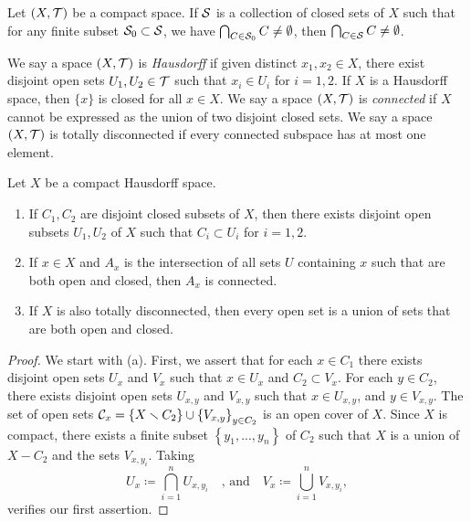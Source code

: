 \begin{lemma}
Let $(X,\mathcal{T})$ be a compact space. If $\mathcal{S}$ is a collection of closed
sets of $X$ such that for any finite subset $\mathcal{S}_0\subset\mathcal{S}$, we have
$\bigcap_{C\in\mathcal{S}_0}C\neq\emptyset$, then $\bigcap_{C\in\mathcal{S}}C\neq\emptyset$.
\end{lemma}

We say a space $(X,\mathcal{T})$ is \emph{Hausdorff} if given distinct
$x_1,x_2\in X$, there exist disjoint open sets $U_1,U_2\in\mathcal{T}$ such that
$x_i\in U_i$ for $i=1,2$. If $X$ is a Hausdorff space, then $\{x\}$ is
closed for all $x\in X$. We say a space $(X,\mathcal{T})$ is \emph{connected} if
$X$ cannot be expressed as the union of two disjoint closed sets. We say a
space $(X,\mathcal{T})$ is totally disconnected if every connected subspace has
at most one element.

\begin{lemma}
Let $X$ be a compact Hausdorff space.
\begin{enumerate}[label=(\alph*)]
\item If $C_1,C_2$ are disjoint closed subsets of $X$, then there exists
  disjoint open subsets $U_1,U_2$ of $X$ such that $C_i\subset U_i$ for
  $i=1,2$.
\item If $x\in X$ and $A_x$ is the intersection of all sets $U$ containing
  $x$ such that are both open and closed, then $A_x$ is connected.
\item If $X$ is also totally disconnected, then every open set is a union
  of sets that are both open and closed.
\end{enumerate}
\end{lemma}
\begin{proof}
We start with (a). First, we assert that for each $x\in C_1$ there exists
disjoint open sets $U_x$ and $V_x$ such that $x\in U_x$ and $C_2\subset
V_x$. For each $y\in C_2$, there exists disjoint open sets $U_{x,y}$ and
$V_{x,y}$ such that $x\in U_{x,y}$, and $y\in V_{x,y}$. The set of open
sets $\calC_x=\left\{X\minus C_2\right\}\cup\left\{V_{x,y}\right\}_{y\in
  C_2}$ is an open cover of $X$. Since $X$ is compact, there exists a
finite subset $\left\{y_1,...,y_n\right\}$ of $C_2$ such that $X$ is a
union of $X-C_2$ and the sets $V_{x,y_i}$. Taking
\[
U_x\coloneqq\bigcap_{i=1}^n U_{x,y_i}\quad\text{, and}\quad
V_x\coloneqq\bigcup_{i=1}^n V_{x,y_i},
\]
verifies our first assertion.
\end{proof}

